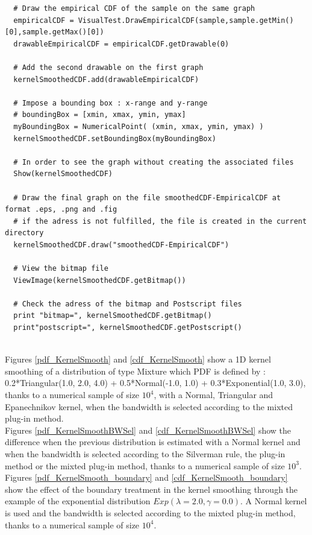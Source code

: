 \begin{lstlisting}
  # Draw the empirical CDF of the sample on the same graph
  empiricalCDF = VisualTest.DrawEmpiricalCDF(sample,sample.getMin()[0],sample.getMax()[0])
  drawableEmpiricalCDF = empiricalCDF.getDrawable(0)

  # Add the second drawable on the first graph
  kernelSmoothedCDF.add(drawableEmpiricalCDF)

  # Impose a bounding box : x-range and y-range
  # boundingBox = [xmin, xmax, ymin, ymax]
  myBoundingBox = NumericalPoint( (xmin, xmax, ymin, ymax) )
  kernelSmoothedCDF.setBoundingBox(myBoundingBox)

  # In order to see the graph without creating the associated files
  Show(kernelSmoothedCDF)

  # Draw the final graph on the file smoothedCDF-EmpiricalCDF at format .eps, .png and .fig
  # if the adress is not fulfilled, the file is created in the current directory
  kernelSmoothedCDF.draw("smoothedCDF-EmpiricalCDF")

  # View the bitmap file
  ViewImage(kernelSmoothedCDF.getBitmap())

  # Check the adress of the bitmap and Postscript files
  print "bitmap=", kernelSmoothedCDF.getBitmap()
  print"postscript=", kernelSmoothedCDF.getPostscript()
\end{lstlisting}
\textspace\\


Figures \ref{pdf_KernelSmooth} and \ref{cdf_KernelSmooth}  show a 1D kernel smoothing of a distribution of type Mixture which PDF is defined by : 0.2*Triangular(1.0, 2.0, 4.0) + 0.5*Normal(-1.0, 1.0) + 0.3*Exponential(1.0, 3.0), thanks to a numerical sample of size $10^4$, with a Normal,  Triangular and Epanechnikov kernel, when the  bandwidth is selected according to the mixted plug-in method.\\

Figures \ref{pdf_KernelSmoothBWSel} and \ref{cdf_KernelSmoothBWSel} show the difference when the previous distribution is estimated with  a Normal kernel and when the bandwidth is selected according to the Silverman rule, the plug-in method or the mixted plug-in method, thanks to a numerical sample of size $10^3$.\\

Figures \ref{pdf_KernelSmooth_boundary} and \ref{cdf_KernelSmooth_boundary} show the effect of the boundary treatment in the kernel smoothing through the example of the exponential distribution $Exp(\lambda = 2.0, \gamma = 0.0)$. A Normal kernel is used and the  bandwidth is selected according to the mixted plug-in method, thanks to a numerical sample of size $10^4$.



